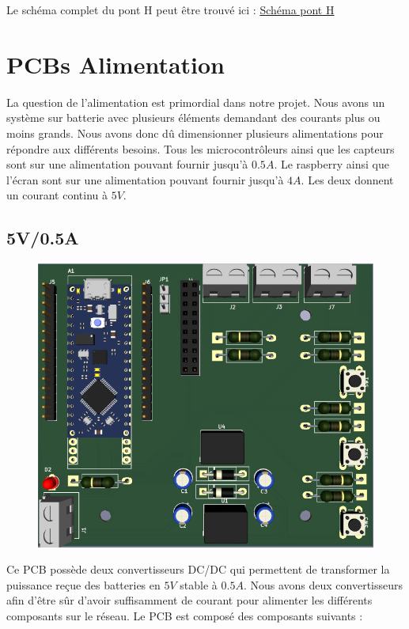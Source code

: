 \documentclass[
	a4paper,									%
	11pt,										%
	twoside,									%
	openright,									%
	notitlepage,									%
	parskip=half,								%
]{scrreprt}										%
\begin{document}
Le schéma complet du pont H peut être trouvé ici : \href{run:./Schema_pont_H}{Schéma pont H}


\section{PCBs Alimentation}

La question de l'alimentation est primordial dans notre projet. Nous avons un système sur batterie avec plusieurs 
éléments demandant des courants plus ou moins grands. Nous avons donc dû dimensionner plusieurs alimentations pour 
répondre aux différents besoins. Tous les microcontrôleurs ainsi que les capteurs sont sur une alimentation pouvant 
fournir jusqu'à $0.5A$. Le raspberry ainsi que l'écran sont sur une alimentation pouvant fournir jusqu'à $4A$. Les
deux donnent un courant continu à $5V$. \par

\newpage
\subsection{5V/0.5A}

\begin{figure}[!h]
	\centering
	\includegraphics[scale=.7]{img/Alimentation5v0.5A.png}
	\label{Alim1A}
\end{figure}

Ce PCB possède deux convertisseurs DC/DC qui permettent de transformer la puissance reçue des batteries en 
$5V$ stable à $0.5A$. Nous avons deux convertisseurs afin d'être sûr d'avoir suffisamment de courant pour alimenter
les différents composants sur le réseau. Le PCB est composé des composants suivants : 
\end{document}
